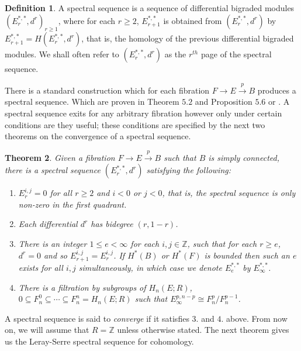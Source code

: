 \documentclass{article}
\theoremstyle{plain}
\newtheorem{thm}{Theorem}[section]
\theoremstyle{definition}
\newtheorem{defn}[thm]{Definition}
\numberwithin{thm}{section}
\begin{document}
		\begin{defn}\label{def:SS}
			A {spectral sequence} is a sequence of differential bigraded modules $(E_{r}^{*,*},d^{r})_{r\geq 1}$, where
			for each $r\geq 2$, $E_{r+1}^{*,*}$ is obtained from $(E_{r}^{*,*},d^{r})$ by $E_{r+1}^{*,*}=H(E_{r}^{*,*},d^{r})$,
			that is, the homology of the previous differential bigraded modules.
			We shall often refer to $(E_{r}^{*,*},d^{r})$ as the { $r^{th}$ page} of the spectral sequence.
		\end{defn}
		
		There is a standard construction which for each fibration $F \to E \xrightarrow{p} B$ produces a spectral sequence.
		Which are proven in \cite[\S 5]{UGSS} Theorem $5.2$ and Proposition $5.6$ or \cite[\S 1.2]{HSS}.
		A spectral sequence exits for any arbitrary fibration however only under certain conditions are they useful;
		these conditions are specified by the next two theorems on the convergence of a spectral sequence.

		\begin{thm}\label{thm:SS}
			Given a fibration $F \to E \xrightarrow{p} B$ such that $B$ is simply connected,
			there is a  spectral sequence $(E_r^{*,*},d^{r})$ satisfying the following:
			\begin{enumerate}
					\item $E_{r}^{i,j}=0$ for all $r \geq 2$ and $i < 0$ or $ j < 0$, that is, the spectral sequence is only non-zero in the first quadrant.
					\item Each differential $d^{r}$ has bidegree $(r,1-r)$. 
					\item There is an integer $1 \leq e<\infty$ for each $i,j\in \mathbb{Z}$, such that for each $r \geq e$, $d^{r}=0$ and so $E_{r+1}^{i,j}=E_{r}^{i,j}$.
								If $H^*(B)$ or $H^*(F)$ is bounded then such an $e$ exists for all $i,j$ simultaneously, in which case we denote $E_{e}^{*,*}$ by $E_{\infty}^{*,*}$.
					\item There is a filtration by subgroups of $H_{n}(E;R)$,
					$0 \subseteq F^{0}_{n} \subseteq \cdots \subseteq F^{n}_{n} =H_{n}(E;R)$
					such that $E_{\infty}^{p,n-p} \cong F^{p}_{n}/F^{p-1}_{n}$.
			\end{enumerate}
		\end{thm}

		A spectral sequence is said to {\it converge} if it satisfies $3.$ and $4.$ above.
		From now on, we will assume that $R=\mathbb{Z}$ unless otherwise stated.
		The next theorem gives us the Leray-Serre spectral sequence for cohomology.
\end{document}

